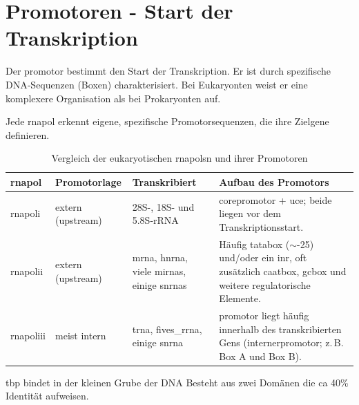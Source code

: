 

\section{Promotoren - Start der Transkription}\label{sec:promotoren-start-der-transkription}
Der \gls{promotor} bestimmt den Start der Transkription.
Er ist durch spezifische DNA‐Sequenzen (Boxen) charakterisiert.
Bei Eukaryonten weist er eine komplexere Organisation als bei Prokaryonten auf.

Jede \gls{rnapol} erkennt eigene, spezifische Promotorsequenzen, die ihre Zielgene definieren.
\begin{table}[h]
    \centering
    \begin{tabular}{|l|l|p{3cm}|p{7cm}|}
        \hline
        \textbf{\gls{rnapol}} & \textbf{Promotorlage} & \textbf{Transkribiert} & \textbf{Aufbau des Promotors} \\
        \hline
        \gls{rnapoli} &
        extern (upstream) &
        28S-, 18S- und 5.8S-rRNA &
        \gls{corepromotor} + \gls{uce}; beide liegen vor dem Transkriptionsstart. \\
        \hline
        \gls{rnapolii} &
        extern (upstream) &
        \gls{mrna}, \gls{hnrna}, viele \glspl{mirna}, einige \glspl{snrna}
        &
        Häufig \gls{tatabox} ($\sim$-25) und/oder ein \gls{inr}, oft zusätzlich \gls{caatbox}, \gls{gcbox} und weitere
        regulatorische
        Elemente.
        \\
        \hline
        \gls{rnapoliii} &
        meist intern &
        \gls{trna}, \gls{fives_rrna}, einige \gls{snrna} &
        \gls{promotor} liegt häufig innerhalb des transkribierten Gens (\gls{internerpromotor}; z.\,B. Box A und Box B). \\
        \hline
    \end{tabular}
    \caption{Vergleich der eukaryotischen \glspl{rnapol}n und ihrer Promotoren}
    \label{tab:rna_polymerasen_promotoren}
\end{table}
\gls{tbp} bindet in der kleinen Grube der DNA
Besteht aus zwei Domänen die ca 40\% Identität aufweisen.

